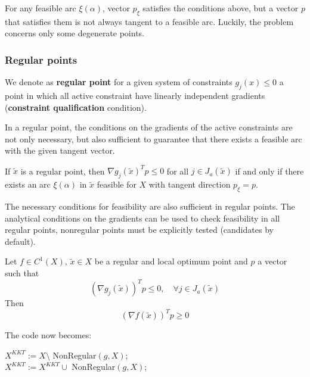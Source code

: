 For any feasible arc $\xi (\alpha)$, vector $p_\xi$ satisfies the conditions above, but a vector $p$ that satisfies them is not always tangent to a feasible arc. Luckily, the problem concerns only some degenerate points.

\subsubsection{Regular points}

\begin{definition}
	We denote as \textbf{regular point} for a given system of constraints $g_j (x) \leq 0$ a point in which all active constraint have linearly independent gradients (\textbf{constraint qualification} condition).
\end{definition}

In a regular point, the conditions on the gradients of the active constraints are not only necessary, but also sufficient to guarantee that there exists a feasible arc with the given tangent vector. \\

\begin{theo}
	If $\tilde x$ is a regular point, then $\nabla g_j (\tilde x)^T p \leq 0$ for all $j \in J_a (\tilde x)$ if and only if there exists an arc $\xi (\alpha)$ in $\tilde x$ feasible for $X$ with tangent direction $p_\xi = p$.
\end{theo}

The necessary conditions for feasibility are also sufficient in regular points. The analytical conditions on the gradients can be used to check feasibility in all regular points, nonregular points must be explicitly tested (candidates by default). \\

\begin{coro}
	\label{cor:firstgeo}
	Let $f \in C^1 (X)$, $\tilde x \in X$ be a regular and local optimum point and $p$ a vector such that
	$$ (\nabla g_j (\tilde x))^T p \leq 0, \quad \forall j \in J_a (\tilde x) $$
	Then 
	$$ (\nabla f(\tilde x))^T p \geq 0 $$
\end{coro}

The code now becomes:
\begin{myalgo}{0.85}
	$X^{KKT} := X \setminus$ NonRegular$(g, X)$; \\
	$X^{KKT} := X^{KKT} \cup $ NonRegular$(g,X)$; \\
\end{myalgo}

